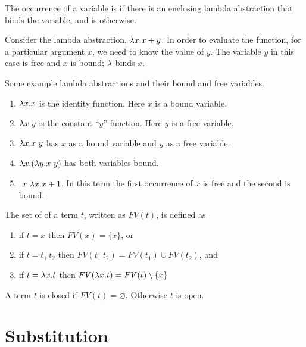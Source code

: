 \begin{definition}
The occurrence of a variable is  if there is an enclosing
lambda abstraction that binds the variable, and is 
otherwise.
\end{definition}

\begin{example}
Consider the lambda abstraction, $\lambda x. x + y$.  In order to evaluate
the function, for a particular argument $x$, we need to know
the value of $y$.  The variable $y$ in this case is free and $x$
is bound; $\lambda$ binds $x$.  
\end{example}


\begin{example} 
  Some example lambda abstractions and their bound and free variables.
\begin{enumerate}
\item $\lambda x. x$ is the identity function. Here $x$ is a bound variable.
\item $\lambda x. y$ is the constant ``$y$'' function. Here $y$ is a free variable.
\item $\lambda x. x~y$ has $x$ as a bound variable and $y$ as a free variable.
\item $\lambda x. (\lambda y. x~y)$ has both variables bound.
\item $~x~\lambda x. x + 1$.  In this term the first occurrence of $x$ is
  free and the second is bound.
\end{enumerate}
\end{example}


\begin{definition}
\label{def:FV}
The set of  of a term $t$, written as $FV(t)$,
is defined as 
\begin{enumerate}
\item if $t = x$ then $FV(x) = \{ x \}$, or
\item if $t = t_1~t_2$ then $FV(t_1~t_2)=FV(t_1) \cup FV(t_2)$, and
\item if $t = \lambda x. t$ then $FV(\lambda x.t)=FV(t) \setminus \{x\}$
\end{enumerate}
\end{definition}

\begin{definition}
A term $t$ is closed if $FV(t) = \varnothing$. Otherwise $t$ is open. 
\end{definition}




\section{Substitution}
\label{sec:substitution}

